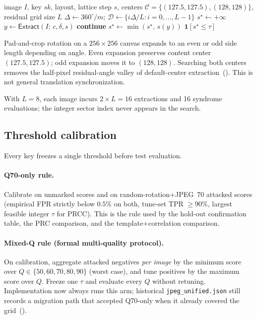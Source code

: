 \documentclass[11pt,a4paper]{article}
\newcommand{\Extract}{\mathsf{Extract}}
\newcommand{\sk}{\mathit{sk}}
\begin{document}
\begin{algorithm}[t]
\caption{Blind detection (baseline~C)}
\label{alg:detect}
\begin{algorithmic}[1]
\Require image \(I\), key \(\sk\), layout, lattice step \(s\), centers
\(\mathcal{C}=\{(127.5,127.5),(128,128)\}\), residual grid size \(L\)
\State \(\Delta\leftarrow 360^\circ/m\); \(\mathcal{D}\leftarrow\{i\Delta/L:i=0,\ldots,L-1\}\)
\State \(s^\star\leftarrow +\infty\)
    \State \(y\leftarrow\Extract(I;\,c,\delta,s)\) 
      \State \textbf{continue}
    \EndIf
    \State \(s^\star\leftarrow\min(s^\star,\,s(y))\)
  \EndFor
\EndFor
\State \Return \(\mathbf{1}[s^\star\le\tau]\)
\end{algorithmic}
\end{algorithm}

Pad-and-crop rotation on a \(256\times256\) canvas expands to an even or odd side
length depending on angle.
Even expansion preserves content center \((127.5,127.5)\); odd expansion moves it to
\((128,128)\).
Searching both centers removes the half-pixel residual-angle valley of
default-center extraction~().
This is not general translation synchronization.

With \(L=8\), each image incurs \(2\times L=16\) extractions and 16 syndrome
evaluations; the integer sector index never appears in the search.

\subsection{Threshold calibration}
\label{sec:calib}

Every key freezes a single threshold before test evaluation.

\paragraph{Q70-only rule.}
Calibrate on unmarked scores and on random-rotation+JPEG~70 attacked scores
(empirical FPR strictly below \(0.5\%\) on both, tune-set TPR \(\ge 90\%\), largest
feasible integer \(\tau\) for PRCC).
This is the rule used by the hold-out confirmation table, the PRC comparison, and
the template+correlation comparison.

\paragraph{Mixed-Q rule (formal multi-quality protocol).}
On calibration, aggregate attacked negatives \emph{per image} by the minimum score
over \(Q\in\{50,60,70,80,90\}\) (worst case), and tune positives by the maximum
score over \(Q\).
Freeze one \(\tau\) and evaluate every \(Q\) without retuning.
Implementation now always runs this arm; historical \texttt{jpeg\_unified.json}
still records a migration path that accepted Q70-only when it already covered the
grid~().
\end{document}

